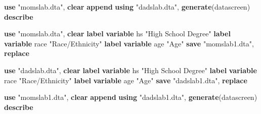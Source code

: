 \documentclass[
]{book}
\newenvironment{Shaded}{\begin{snugshade}}{\end{snugshade}}
\newcommand{\KeywordTok}[1]{\textcolor[rgb]{0.13,0.29,0.53}{\textbf{#1}}}
\newcommand{\NormalTok}[1]{#1}
\newcommand{\StringTok}[1]{\textcolor[rgb]{0.31,0.60,0.02}{#1}}
\begin{document}
\begin{Shaded}
\begin{Highlighting}[]
\KeywordTok{use} \StringTok{"momslab.dta"}\NormalTok{, }\KeywordTok{clear}
\KeywordTok{append} \KeywordTok{using} \StringTok{"dadslab.dta"}\NormalTok{, }\KeywordTok{generate}\NormalTok{(datascreen)}
\KeywordTok{describe}

\KeywordTok{use} \StringTok{"momslab.dta"}\NormalTok{, }\KeywordTok{clear}
\KeywordTok{label} \KeywordTok{variable}\NormalTok{ hs }\StringTok{"High School Degree"}
\KeywordTok{label} \KeywordTok{variable}\NormalTok{ race }\StringTok{"Race/Ethnicity"}
\KeywordTok{label} \KeywordTok{variable}\NormalTok{ age }\StringTok{"Age"}
\KeywordTok{save} \StringTok{"momslab1.dta"}\NormalTok{, }\KeywordTok{replace}

\KeywordTok{use} \StringTok{"dadslab.dta"}\NormalTok{, }\KeywordTok{clear}
\KeywordTok{label} \KeywordTok{variable}\NormalTok{ hs }\StringTok{"High School Degree"}
\KeywordTok{label} \KeywordTok{variable}\NormalTok{ race }\StringTok{"Race/Ethnicity"}
\KeywordTok{label} \KeywordTok{variable}\NormalTok{ age }\StringTok{"Age"}
\KeywordTok{save} \StringTok{"dadslab1.dta"}\NormalTok{, }\KeywordTok{replace}

\KeywordTok{use} \StringTok{"momslab1.dta"}\NormalTok{, }\KeywordTok{clear}
\KeywordTok{append} \KeywordTok{using} \StringTok{"dadslab1.dta"}\NormalTok{, }\KeywordTok{generate}\NormalTok{(datascreen)}
\KeywordTok{describe}
\end{Highlighting}
\end{Shaded}
\end{document}
